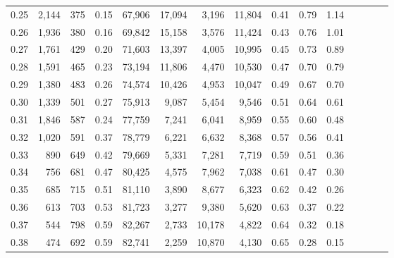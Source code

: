 \begin{tabular}{rrrcrrrrrrrrrrr}
0.25 &  2,144 &  375 &                                       0.15 &  67,906 &  17,094 &   3,196 &  11,804 &  0.41 &  0.79 &                         1.14 \\
0.26 &  1,936 &  380 &                                       0.16 &  69,842 &  15,158 &   3,576 &  11,424 &  0.43 &  0.76 &                         1.01 \\
0.27 &  1,761 &  429 &                                       0.20 &  71,603 &  13,397 &   4,005 &  10,995 &  0.45 &  0.73 &                         0.89 \\
0.28 &  1,591 &  465 &                                       0.23 &  73,194 &  11,806 &   4,470 &  10,530 &  0.47 &  0.70 &                         0.79 \\
0.29 &  1,380 &  483 &                                       0.26 &  74,574 &  10,426 &   4,953 &  10,047 &  0.49 &  0.67 &                         0.70 \\
0.30 &  1,339 &  501 &                                       0.27 &  75,913 &   9,087 &   5,454 &   9,546 &  0.51 &  0.64 &                         0.61 \\
0.31 &  1,846 &  587 &                                       0.24 &  77,759 &   7,241 &   6,041 &   8,959 &  0.55 &  0.60 &                         0.48 \\
0.32 &  1,020 &  591 &                                       0.37 &  78,779 &   6,221 &   6,632 &   8,368 &  0.57 &  0.56 &                         0.41 \\
0.33 &    890 &  649 &                                       0.42 &  79,669 &   5,331 &   7,281 &   7,719 &  0.59 &  0.51 &                         0.36 \\
0.34 &    756 &  681 &                                       0.47 &  80,425 &   4,575 &   7,962 &   7,038 &  0.61 &  0.47 &                         0.30 \\
0.35 &    685 &  715 &                                       0.51 &  81,110 &   3,890 &   8,677 &   6,323 &  0.62 &  0.42 &                         0.26 \\
0.36 &    613 &  703 &                                       0.53 &  81,723 &   3,277 &   9,380 &   5,620 &  0.63 &  0.37 &                         0.22 \\
0.37 &    544 &  798 &                                       0.59 &  82,267 &   2,733 &  10,178 &   4,822 &  0.64 &  0.32 &                         0.18 \\
0.38 &    474 &  692 &                                       0.59 &  82,741 &   2,259 &  10,870 &   4,130 &  0.65 &  0.28 &                         0.15 \\

\end{tabular}

